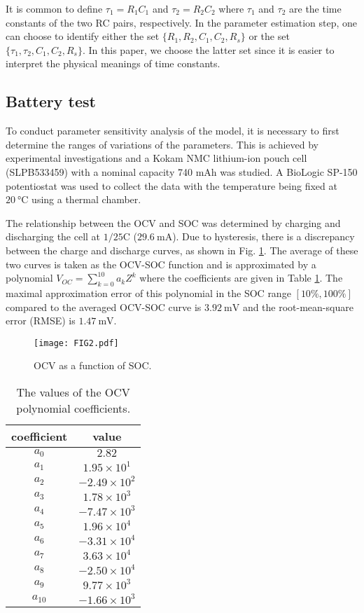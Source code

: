 \documentclass[letterpaper,twocolumn]{IEEEtran}
\begin{document}
It is common to define $\tau_1 = R_1 C_1$ and $\tau_2 = R_2 C_2$ where $\tau_1$ and $\tau_2$ are the time constants of the two RC pairs, respectively. In the parameter estimation step, one can choose to identify either the set $\{R_1,R_2,C_1,C_2, R_s\}$ or the set $\{\tau_1,\tau_2,C_1,C_2, R_s\}$. In this paper, we choose the latter set since it is easier to interpret the physical meanings of time constants.

\subsection{Battery test}
To conduct parameter sensitivity analysis of the model, it is necessary to first determine the ranges of variations of the parameters. This is achieved by experimental investigations and a Kokam NMC lithium-ion pouch cell (SLPB533459) with a nominal capacity 740 mAh was studied. A BioLogic SP-150 potentiostat was used to collect the data with the temperature being fixed at $\SI{20}{\celsius}$ using a thermal chamber.

The relationship between the OCV and SOC was determined by charging and discharging the cell at $1/25$C ($\SI{29.6} {\milli\ampere}$).
Due to hysteresis, there is a discrepancy between the charge and discharge curves, as shown in Fig. \ref{fig:Figure2}. The average of these two curves is taken as the OCV-SOC function and is approximated by a polynomial $V_{OC} = \sum_{k=0}^{10} a_k Z^{k}$
where the coefficients are given in Table \ref{tab:01}. The maximal approximation error of this polynomial in the SOC range $[10\%,100\%]$ compared to the averaged OCV-SOC curve is $\SI{3.92} {\milli\volt}$ and the root-mean-square error (RMSE) is $\SI{1.47} {\milli\volt}$.

\begin{figure}
\centering
\texttt{[image: FIG2.pdf]}
\caption{OCV as a function of SOC.}
\label{fig:Figure2}
\end{figure}



\begin{table}
\centering
\caption{The values of the OCV polynomial coefficients.}
\begin{tabular}{|c|c|}
\hline
 coefficient & value \\
  \hline
$a_0$ & $2.82$ \\
  $a_1$ & $1.95 \times 10^1$ \\
  $a_2$ & $-2.49 \times 10^2$ \\
  $a_3$ & $1.78 \times 10^3$ \\
  $a_4$ & $-7.47 \times 10^3$\\
  $a_5$ & $1.96\times 10^4$ \\
  $a_6$ & $-3.31\times 10^4$  \\
  $a_7$ & $3.63\times 10^4$ \\
  $a_8$ & $-2.50\times 10^4$ \\
  $a_9$ & $9.77 \times 10^3$ \\
  $a_{10}$ & $-1.66\times 10^3$ \\
  \hline
\end{tabular}
\label{tab:01}
\end{table}
\end{document}
